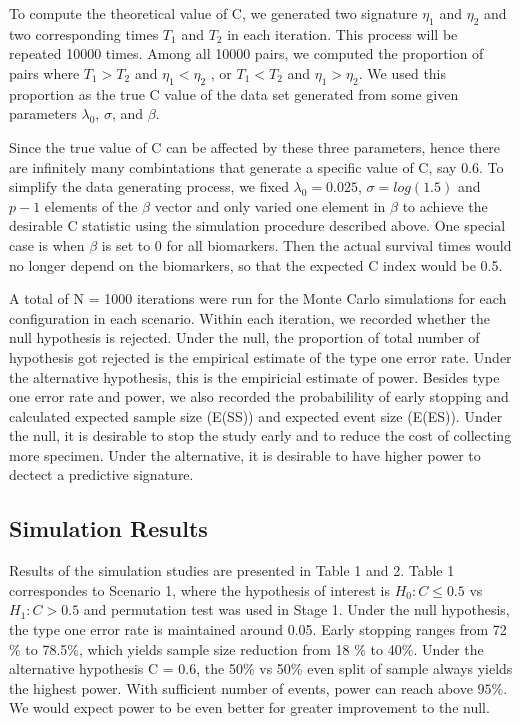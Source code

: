 \documentclass[11pt]{article}
\begin{document}
	\par To compute the theoretical value of C, we generated two signature $\eta_{1}$ and $\eta_2$ and two corresponding times $T_{1}$ and $T_{2}$ in each iteration. This process will be repeated 10000 times. Among all 10000 pairs, we computed the proportion of pairs where $T_{1} > T_{2}$ and $\eta_{1} < \eta_{2}$ , or $T_{1} < T_{2}$ and $\eta_{1} > \eta_{2}$. We used this proportion as the true C value of the data set generated from some given parameters $\lambda_{0}$, $\sigma$, and $\beta$. 

	\par Since the true value of C can be affected by these three parameters, hence there are infinitely many combintations that generate a specific value of C, say 0.6. To simplify the data generating process, we fixed $\lambda_0 = 0.025$, $\sigma = log(1.5)$ and $p - 1$ elements of the $\beta$ vector and only varied one element in $\beta$ to achieve the desirable C statistic using the simulation procedure described above. One special case is when $\beta$ is set to 0 for all biomarkers. Then the actual survival times would no longer depend on the biomarkers, so that the expected C index would be 0.5.

	\par A total of N = 1000 iterations were run for the Monte Carlo simulations for each configuration in each scenario. Within each iteration, we recorded whether the null hypothesis is rejected. Under the null, the proportion of total number of hypothesis got rejected is the empirical estimate of the type one error rate. Under the alternative hypothesis, this is the empiricial estimate of power. Besides type one error rate and power, we also recorded the probabilility of early stopping and calculated expected sample size (E(SS)) and expected event size (E(ES)). Under the null, it is desirable to stop the study early and to reduce the cost of collecting more specimen. Under the alternative, it is desirable to have higher power to dectect a predictive signature. 

	\subsection{Simulation Results}

	\par Results of the simulation studies are presented in Table 1 and 2. Table 1 correspondes to Scenario 1, where the hypothesis of interest is $H_0: C \leq 0.5$ vs $H_1: C > 0.5$ and permutation test was used in Stage 1. Under the null hypothesis, the type one error rate is maintained around 0.05. Early stopping ranges from 72$\%$ to 78.5$\%$, which yields sample size reduction from 18 $\%$ to 40$\%$. Under the alternative hypothesis C = 0.6, the 50$\%$ vs 50$\%$ even split of sample always yields the highest power. With sufficient number of events, power can reach above $95\%$. We would expect power to be even better for greater improvement to the null.
\end{document}

